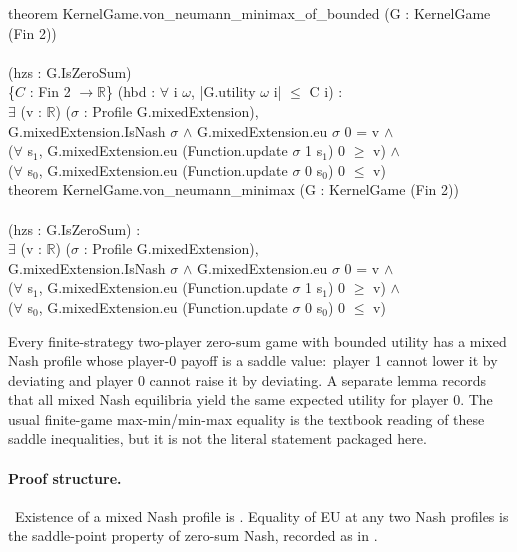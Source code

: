 \begin{leanbox}
theorem KernelGame.von\_neumann\_minimax\_of\_bounded (G : KernelGame (Fin 2))\\
\\
\bd (hzs : G.IsZeroSum)\\
\bd \{$C$ : Fin 2 $\to \mathbb{R}$\} (hbd : $\forall$ i $\omega$, |G.utility $\omega$ i| $\le$ C i) :\\
\bd $\exists$ (v : $\mathbb{R}$) ($\sigma$ : Profile G.mixedExtension),\\
\bdd G.mixedExtension.IsNash $\sigma$ $\wedge$ G.mixedExtension.eu $\sigma$ 0 = v $\wedge$\\
\bdd ($\forall$ s$_1$, G.mixedExtension.eu (Function.update $\sigma$ 1 s$_1$) 0 $\ge$ v) $\wedge$\\
\bdd ($\forall$ s$_0$, G.mixedExtension.eu (Function.update $\sigma$ 0 s$_0$) 0 $\le$ v)\\[3pt]
theorem KernelGame.von\_neumann\_minimax (G : KernelGame (Fin 2))\\
\\
\bd (hzs : G.IsZeroSum) :\\
\bd $\exists$ (v : $\mathbb{R}$) ($\sigma$ : Profile G.mixedExtension),\\
\bdd G.mixedExtension.IsNash $\sigma$ $\wedge$ G.mixedExtension.eu $\sigma$ 0 = v $\wedge$\\
\bdd ($\forall$ s$_1$, G.mixedExtension.eu (Function.update $\sigma$ 1 s$_1$) 0 $\ge$ v) $\wedge$\\
\bdd ($\forall$ s$_0$, G.mixedExtension.eu (Function.update $\sigma$ 0 s$_0$) 0 $\le$ v)
\end{leanbox}

\Mathematical
Every finite-strategy two-player zero-sum game with bounded utility
has a mixed Nash profile whose player-0 payoff is a saddle value:\
player 1 cannot lower it by deviating and player 0 cannot raise it
by deviating.  A separate lemma records that all mixed Nash equilibria yield the same
expected utility for player 0.  The usual finite-game
max-min/min-max equality is the textbook reading of these saddle
inequalities, but it is not the literal statement packaged here.

\paragraph{Proof structure.}\
Existence of a mixed Nash profile is .
Equality of EU at any two Nash profiles is the saddle-point
property of zero-sum Nash, recorded as
\TT{IsZeroSum.nash_eu_eq_of_bounded} in .

